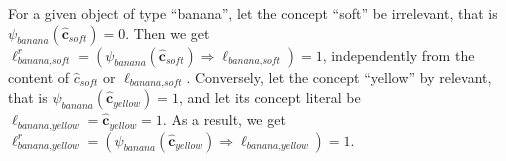 \begin{example}
    For a given object of type ``banana'', let the concept ``soft'' be irrelevant, that is $\psi_{\textit{banana}}(\hat{\mathbf{c}}_{\textit{soft}}) = 0$. Then we get $\ell^r_{\textit{banana},\textit{soft}}=(\psi_{\textit{banana}}(\hat{\mathbf{c}}_{\textit{soft}}) \Rightarrow \ell_{\textit{banana},\textit{soft}})=1$, independently from the content of $\hat{c}_{\textit{soft}}$ or $\ell_{\textit{banana},\textit{soft}}$. Conversely, let the concept ``yellow'' by relevant, that is $\psi_{\textit{banana}}(\hat{\mathbf{c}}_{\textit{yellow}}) = 1$, and let its concept literal be $\ell_{\textit{banana},\textit{yellow}}=\hat{\mathbf{c}}_{\textit{yellow}}=1$. As a result, we get
    $\ell^r_{\textit{banana},\textit{yellow}}=(\psi_{\textit{banana}}(\hat{\mathbf{c}}_{\textit{yellow}}) \Rightarrow \ell_{\textit{banana},\textit{yellow}})=1$.
\end{example}



